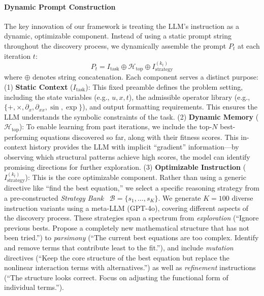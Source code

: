 \paragraph{Dynamic Prompt Construction} The key innovation of our framework is treating the LLM's instruction as a dynamic, optimizable component. Instead of using a static prompt string throughout the discovery process, we dynamically assemble the prompt $P_t$ at each iteration $t$:
\begin{equation}
    P_t = I_{\text{task}} \oplus \mathcal{H}_{\text{top}} \oplus I_{\text{strategy}}^{(k_t)}
\end{equation}
where $\oplus$ denotes string concatenation. Each component serves a distinct purpose: (1) \textbf{Static Context} ($I_{\text{task}}$): This fixed preamble defines the problem setting, including the state variables (e.g., $u, x, t$), the admissible operator library (e.g., $\{+, \times, \partial_x, \partial_{xx}, \sin, \exp\}$), and output formatting requirements. This ensures the LLM understands the symbolic constraints of the task. (2) \textbf{Dynamic Memory} ($\mathcal{H}_{\text{top}}$): To enable learning from past iterations, we include the top-$N$ best-performing equations discovered so far, along with their fitness scores. This in-context history provides the LLM with implicit ``gradient'' information---by observing which structural patterns achieve high scores, the model can identify promising directions for further exploration. (3) \textbf{Optimizable Instruction} ($I_{\text{strategy}}^{(k_t)}$): This is the core optimizable component. Rather than using a generic directive like ``find the best equation,'' we select a specific reasoning strategy from a pre-constructed \textit{Strategy Bank}~\citep{zhou2023ape,sun2024ease} $\mathcal{B} = \{s_1, \ldots, s_K\}$. We generate $K=100$ diverse instruction variants using a meta-LLM (GPT-4o), covering different aspects of the discovery process. These strategies span a spectrum from \textit{exploration} (``Ignore previous bests. Propose a completely new mathematical structure that has not been tried.'') to \textit{parsimony} (``The current best equations are too complex. Identify and remove terms that contribute least to the fit.''), and include \textit{mutation} directives (``Keep the core structure of the best equation but replace the nonlinear interaction terms with alternatives.'') as well as \textit{refinement} instructions (``The structure looks correct. Focus on adjusting the functional form of individual terms.'').


